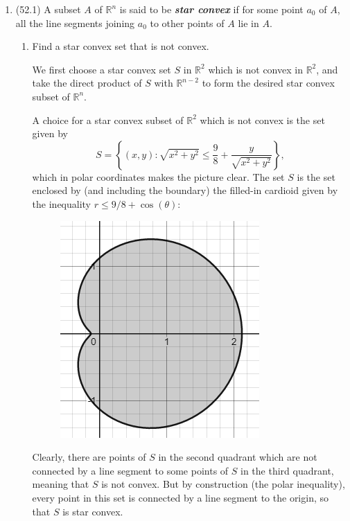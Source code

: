 \documentclass[11pt]{article}
\newcommand{\cbr}[1]{\left\{#1\right\}}
\begin{document}
\begin{enumerate}
\begin{enumerate}[label=(\alph*)]
\begin{proof}
            By transitivity again it follows that any two continuous maps from $X$ into $Y$ are homotopic so that $[X,Y]$ only has one element.
        \end{proof}
    \end{enumerate}
    \item (52.1) A subset $A$ of $\mathbb{R}^n$ is said to be \textbf{\textit{star convex}} if for some point $a_0$ of $A$, all the line segments joining $a_0$ to other points of $A$ lie in $A$. \begin{enumerate}[label=(\alph*)]
        \item Find a star convex set that is not convex.
        
        We first choose a star convex set $S$ in $\mathbb{R}^2$ which is not convex in $\mathbb{R}^2$, and take the direct product of $S$ with $\mathbb{R}^{n-2}$ to form the desired star convex subset of $\mathbb{R}^n$.
        
        A choice for a star convex subset of $\mathbb{R}^2$ which is not convex is the set given by \[S = \cbr{(x,y)\colon \sqrt{x^2+y^2} \leq \frac{9}{8} + \frac{y}{\sqrt{x^2+y^2}}},\] which in polar coordinates makes the picture clear. The set $S$ is the set enclosed by (and including the boundary) the filled-in cardioid given by the inequality $r \leq 9/8 + \cos(\theta)$: 

        \begin{figure}[h]
            \centering
            \includegraphics[scale=0.5]{cardioid}
        \end{figure}

        Clearly, there are points of $S$ in the second quadrant which are not connected by a line segment to some points of $S$ in the third quadrant, meaning that $S$ is not convex. But by construction (the polar inequality), every point in this set is connected by a line segment to the origin, so that $S$ is star convex.


\end{enumerate}
\end{enumerate}
\end{document}
